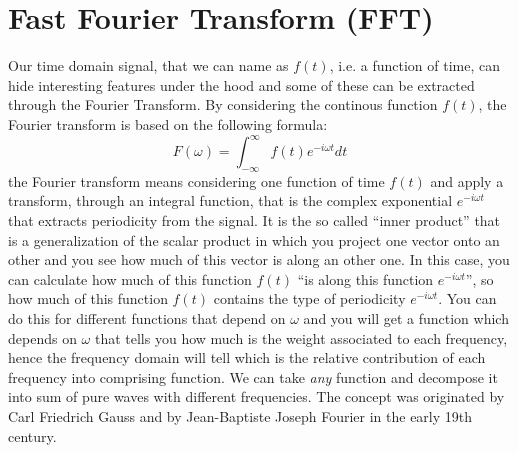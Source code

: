 \documentclass[12pt,a4paper]{report}
\begin{document}
\section{Fast Fourier Transform (FFT)}
Our time domain signal, that we can name as $f(t)$, i.e. a function of time, can hide interesting features under the hood and some of these can be extracted through the Fourier Transform. By considering the continous function $f(t)$, the Fourier transform is based on the following formula:
\begin{equation}\label{FourierTransformFormula}
 F(\omega) = \int_{-\infty}^{\infty} f(t)e^{-i\omega t}dt
\end{equation}
the Fourier transform means considering one function of time $f(t)$ and apply a transform, through an integral function, that is the complex exponential $e^{-i\omega t}$ that extracts periodicity from the signal. It is the so called ``inner product'' that is a generalization of the scalar product in which you project one vector onto an other and you see how much of this vector is along an other one. In this case, you can calculate how much of this function $f(t)$ ``is along this function $e^{-i\omega t}$'', so how much of this function $f(t)$ contains the type of periodicity $e^{-i\omega t}$. You can do this for different functions that depend on $\omega$ and you will get a function which depends on $\omega$ that tells you how much is the weight associated to each frequency, hence the frequency domain will tell which is the relative contribution of each frequency into comprising function. We can take \emph{any} function and decompose it into sum of pure waves with different frequencies. The concept was originated by Carl Friedrich Gauss and by Jean-Baptiste Joseph Fourier in the early 19th century. 
\end{document}
